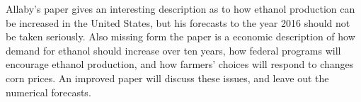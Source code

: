 \documentclass[12pt]{article}
\begin{document}
Allaby's paper gives an interesting description as to how ethanol production can be increased in the United States, but his forecasts to the year 2016 should not be taken seriously.  Also missing form the paper is a economic description of how demand for ethanol should increase over ten years, how federal programs will encourage ethanol production, and how farmers' choices will respond to changes corn prices.  An improved paper will discuss these issues, and leave out the numerical forecasts.
\end{document}
